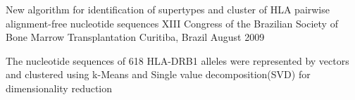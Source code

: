 

\begin{cventries}

  \cventry
    {New algorithm for identification of supertypes and cluster of HLA pairwise alignment-free nucleotide sequences}
    {XIII Congress of the Brazilian Society of Bone Marrow Transplantation} %
    {Curitiba, Brazil} %
    {August 2009} %
    {
      \begin{cvitems} %
        \item {The nucleotide sequences of 618 HLA-DRB1 alleles were represented by vectors and clustered using k-Means and Single value decomposition(SVD) for dimensionality reduction}
      \end{cvitems}
}
\end{cventries}

